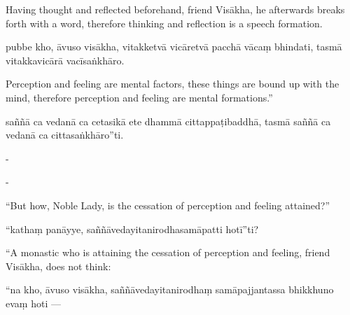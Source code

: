 \begin{samepage}
\begin{leftcolumn*}
Having thought and reflected beforehand, friend Visākha, he afterwards breaks forth with a word, therefore thinking and reflection is a speech formation.
\end{leftcolumn*}

\begin{rightcolumn}
pubbe kho, āvuso visākha, vitakketvā vicāretvā pacchā vācaṃ bhindati, tasmā vitakkavicārā vacīsaṅkhāro.
\end{rightcolumn}
\end{samepage}

\begin{samepage}
\begin{leftcolumn*}
Perception and feeling are mental factors, these things are bound up with the mind, therefore perception and feeling are mental formations.”
\end{leftcolumn*}

\begin{rightcolumn}
saññā ca vedanā ca cetasikā ete dhammā cittappaṭibaddhā, tasmā saññā ca vedanā ca cittasaṅkhāro”ti.
\end{rightcolumn}
\end{samepage}

\begin{samepage}
\begin{leftcolumn*}
-
\end{leftcolumn*}

\begin{rightcolumn}
-
\end{rightcolumn}
\end{samepage}

\begin{samepage}
\begin{leftcolumn*}
“But how, Noble Lady, is the cessation of perception and feeling attained?”
\end{leftcolumn*}

\begin{rightcolumn}
“kathaṃ panāyye, saññāvedayitanirodhasamāpatti hotī”ti?
\end{rightcolumn}
\end{samepage}

\begin{samepage}
\begin{leftcolumn*}
“A monastic who is attaining the cessation of perception and feeling, friend Visākha, does not think:
\end{leftcolumn*}

\begin{rightcolumn}
“na kho, āvuso visākha, saññāvedayitanirodhaṃ samāpajjantassa bhikkhuno evaṃ hoti —
\end{rightcolumn}
\end{samepage}

